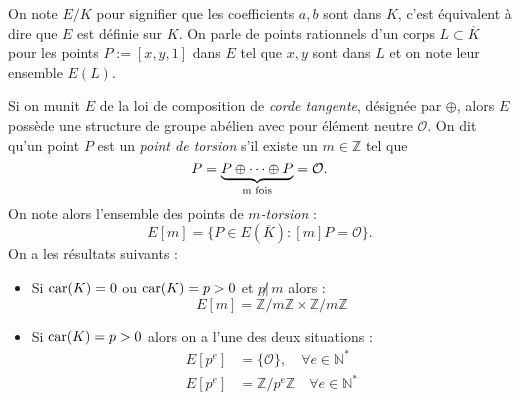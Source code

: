 \documentclass[a4paper]{article} %
\numberwithin{section}{part}
\numberwithin{equation}{section}
\newcommand\zmodn[1]{\mathbb{Z}/#1\mathbb{Z}}
\newcommand\ZZ{\mathbb{Z}}
\newcommand\NN{\mathbb{N}}
\newcommand\EO{\mathcal{O}}
\begin{document}
On note $E/K$ pour signifier que les coefficients $a, b$ sont dans $K$, c'est
équivalent à dire que $E$ est définie sur $K$. On parle de points rationnels 
d'un corps $L\subset\overline{K}$ pour les points
$P := [x,y,1]$ dans $E$ tel que $x, y$ sont dans $L$ et on note leur ensemble
$E(L)$.\par
\vspace{0.3cm}
Si on munit $E$ de la loi de composition de \emph{corde tangente}, désignée par
$\oplus$, alors $E$ possède une structure de groupe abélien avec pour élément 
neutre $\EO$. On dit qu'un point $P$ est un \emph{point de torsion} s'il existe 
un $m\in\ZZ$ tel que 
\begin{equation}
[m]P = \underbrace{P\oplus\dots\oplus P}_{\textup{m fois}} = \EO.
\end{equation}
On note alors l'ensemble des points de \emph{$m$-torsion} :
\begin{equation}
E[m] = \lbrace{P\in E(\overline{K}) : [m]P = \EO}\rbrace.
\end{equation}
On a les résultats suivants :
\vspace{0.3cm}
\begin{itemize}
\item Si $\textup{car}(K) = 0$ ou $\textup{car}(K) = p > 0$ et $p\not|\,m$ 
alors :
\begin{equation}
E[m] = \zmodn{m}\times\zmodn{m}
\end{equation}
\item Si $\textup{car}(K) = p > 0$ alors on a l'une des deux situations :
    \begin{align} 
    E[p^e] &= \lbrace{\EO}\rbrace, \quad \forall e\in\NN^{*}\\
    E[p^e] &= \zmodn{p^e}\quad \forall e\in\NN^{*}
    \end{align}
\end{itemize}
\vspace{0.3cm}
\end{document}
